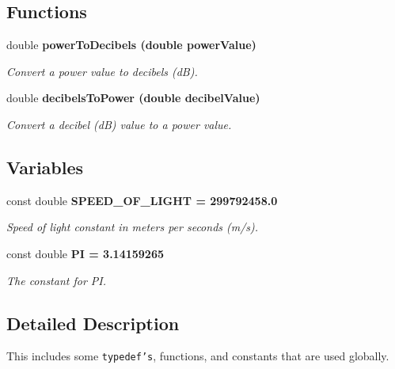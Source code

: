 \subsection*{Functions}
\begin{CompactItemize}
\item 
double \bf{power\-To\-Decibels} (double power\-Value)
\begin{CompactList}\small\item\em Convert a power value to decibels (d\-B). \item\end{CompactList}\item 
double \bf{decibels\-To\-Power} (double decibel\-Value)
\begin{CompactList}\small\item\em Convert a decibel (d\-B) value to a power value. \item\end{CompactList}\end{CompactItemize}
\subsection*{Variables}
\begin{CompactItemize}
\item 
const double \bf{SPEED\_\-OF\_\-LIGHT} = 299792458.0\label{utility_8hpp_a9d062184e1c09d26080c7fe53b33b9e}

\begin{CompactList}\small\item\em Speed of light constant in meters per seconds (m/s). \item\end{CompactList}\item 
const double \bf{PI} = 3.14159265\label{utility_8hpp_952eac791b596a61bba0a133a3bb439f}

\begin{CompactList}\small\item\em The constant for PI. \item\end{CompactList}\end{CompactItemize}


\subsection{Detailed Description}
This includes some {\tt typedef's}, functions, and constants that are used globally. 




